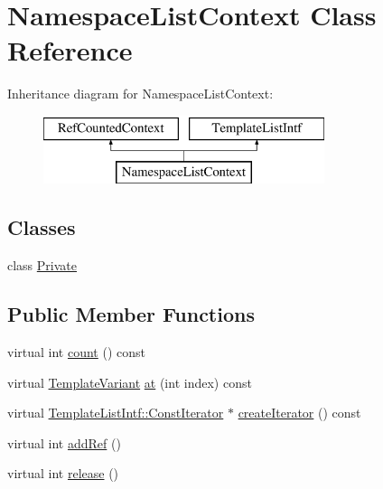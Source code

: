 \hypertarget{class_namespace_list_context}{}\section{Namespace\+List\+Context Class Reference}
\label{class_namespace_list_context}
Inheritance diagram for Namespace\+List\+Context\+:\begin{figure}[H]
\begin{center}
\leavevmode
\includegraphics[height=2.000000cm]{class_namespace_list_context}
\end{center}
\end{figure}
\subsection*{Classes}
\begin{DoxyCompactItemize}
\item 
class \mbox{\hyperlink{class_namespace_list_context_1_1_private}{Private}}
\end{DoxyCompactItemize}
\subsection*{Public Member Functions}
\begin{DoxyCompactItemize}
\item 
virtual int \mbox{\hyperlink{class_namespace_list_context_a576ee9f319a20d0fa16fdcb3b4a3a550}{count}} () const
\item 
virtual \mbox{\hyperlink{class_template_variant}{Template\+Variant}} \mbox{\hyperlink{class_namespace_list_context_aad786580251baade29f06a76612201cd}{at}} (int index) const
\item 
virtual \mbox{\hyperlink{class_template_list_intf_1_1_const_iterator}{Template\+List\+Intf\+::\+Const\+Iterator}} $\ast$ \mbox{\hyperlink{class_namespace_list_context_aa889694ea771d93d1094b33d46cb4208}{create\+Iterator}} () const
\item 
virtual int \mbox{\hyperlink{class_namespace_list_context_a59c6b6d62a82299a64b36709f6db156f}{add\+Ref}} ()
\item 
virtual int \mbox{\hyperlink{class_namespace_list_context_a8395f4caf4473517e10e0375efe0e419}{release}} ()
\end{DoxyCompactItemize}
